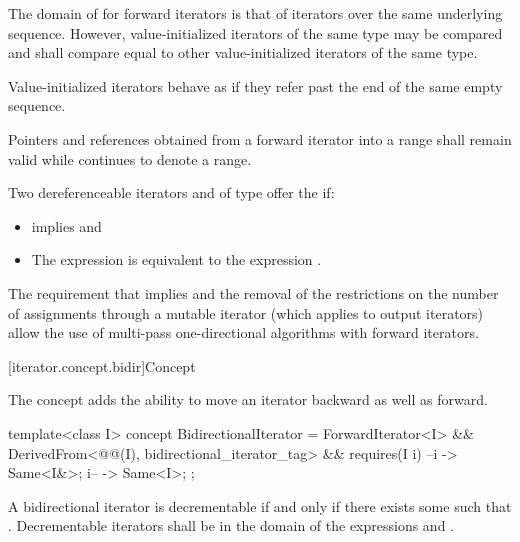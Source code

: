 \pnum
The domain of \tcode{==} for forward iterators is that of iterators over the same
underlying sequence. However, value-initialized iterators of the same type
may be compared and shall compare equal to other value-initialized iterators of the same type.
\begin{note}
Value-initialized iterators behave as if they refer past the end of the same
empty sequence.
\end{note}

\pnum
Pointers and references obtained from a forward iterator into a range 
shall remain valid while  continues to denote a range.

\pnum
Two dereferenceable iterators  and  of type 
offer the  if:

\begin{itemize}
\item {} implies  and
\item The expression
 is equivalent to the expression .
\end{itemize}

\pnum
\begin{note}
The requirement that
implies
and the removal of the restrictions on the number of assignments through
a mutable iterator
(which applies to output iterators)
allow the use of multi-pass one-directional algorithms with forward iterators.
\end{note}

[iterator.concept.bidir]{Concept }

\pnum
The  concept adds the ability
to move an iterator backward as well as forward.

%
\begin{codeblock}
template<class I>
  concept BidirectionalIterator =
    ForwardIterator<I> &&
    DerivedFrom<@@(I), bidirectional_iterator_tag> &&
    requires(I i) {
      { --i } -> Same<I&>;
      { i-- } -> Same<I>;
    };
\end{codeblock}

\pnum
A bidirectional iterator  is decrementable if and only if there exists some  such that
. Decrementable iterators  shall be in the domain of the expressions
 and .


